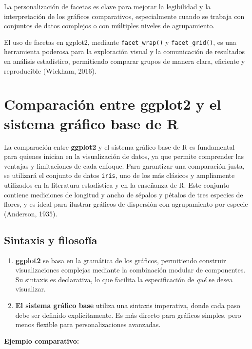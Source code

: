 \documentclass[
  spanish,
  a4paper,
  DIV=11,
  numbers=noendperiod,
  onepage,
  openany]{scrreprt}
\begin{document}
La personalización de facetas es clave para mejorar la legibilidad y la
interpretación de los gráficos comparativos, especialmente cuando se
trabaja con conjuntos de datos complejos o con múltiples niveles de
agrupamiento.

El uso de facetas en ggplot2, mediante \texttt{facet\_wrap()} y
\texttt{facet\_grid()}, es una herramienta poderosa para la exploración
visual y la comunicación de resultados en análisis estadístico,
permitiendo comparar grupos de manera clara, eficiente y reproducible
(Wickham, 2016).

\section{Comparación entre ggplot2 y el sistema gráfico base de
R}\label{comparaciuxf3n-entre-ggplot2-y-el-sistema-gruxe1fico-base-de-r}

La comparación entre \textbf{ggplot2} y el sistema gráfico base de R es
fundamental para quienes inician en la visualización de datos, ya que
permite comprender las ventajas y limitaciones de cada enfoque. Para
garantizar una comparación justa, se utilizará el conjunto de datos
\texttt{iris}, uno de los más clásicos y ampliamente utilizados en la
literatura estadística y en la enseñanza de R. Este conjunto contiene
mediciones de longitud y ancho de sépalos y pétalos de tres especies de
flores, y es ideal para ilustrar gráficos de dispersión con agrupamiento
por especie (Anderson, 1935).

\subsection{Sintaxis y filosofía}\label{sintaxis-y-filosofuxeda}

\begin{enumerate}
\def\labelenumi{\arabic{enumi}.}
\item
  \textbf{ggplot2} se basa en la gramática de los gráficos, permitiendo
  construir visualizaciones complejas mediante la combinación modular de
  componentes. Su sintaxis es declarativa, lo que facilita la
  especificación de \emph{qué} se desea visualizar.
\item
  \textbf{El sistema gráfico base} utiliza una sintaxis imperativa,
  donde cada paso debe ser definido explícitamente. Es más directo para
  gráficos simples, pero menos flexible para personalizaciones
  avanzadas.
\end{enumerate}

\textbf{Ejemplo comparativo:}
\end{document}
